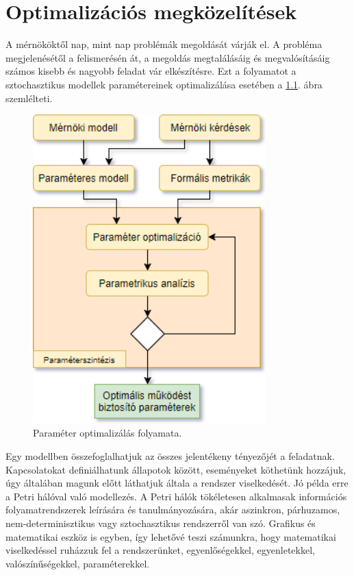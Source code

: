 \chapter{Optimalizációs megközelítések}
\label{sec:optimalizacios-megkozelitesek}

A mérnököktől nap, mint nap problémák megoldását várják el. A probléma megjelenésétől a felismerésén át, a megoldás megtalálásáig és megvalósításáig számos kisebb és nagyobb feladat vár elkészítésre. Ezt a folyamatot a sztochasztikus modellek paramétereinek optimalizálása esetében a \ref{fig:folyamat}. ábra szemlélteti.

\begin{figure}[!ht]
	\centering
	\includegraphics[width=90mm, keepaspectratio]{figures/optmeg.png}
	\caption{Paraméter optimalizálás folyamata.}
	\label{fig:folyamat}
\end{figure}

Egy modellben összefoglalhatjuk az összes jelentékeny tényezőjét a feladatnak. Kapcsolatokat definiálhatunk állapotok között, eseményeket köthetünk hozzájuk, úgy általában magunk előtt láthatjuk általa a rendszer viselkedését. Jó példa erre a Petri hálóval való modellezés. A Petri hálók tökéletesen alkalmasak információs folyamatrendszerek leírására és tanulmányozására, akár aszinkron, párhuzamos, nem-determinisztikus vagy sztochasztikus rendszerről van szó. Grafikus és matematikai eszköz is egyben, így lehetővé teszi számunkra, hogy matematikai viselkedéssel ruházzuk fel a rendszerünket, egyenlőségekkel, egyenletekkel, valószínűségekkel, paraméterekkel.\cite{PetriCikk}

